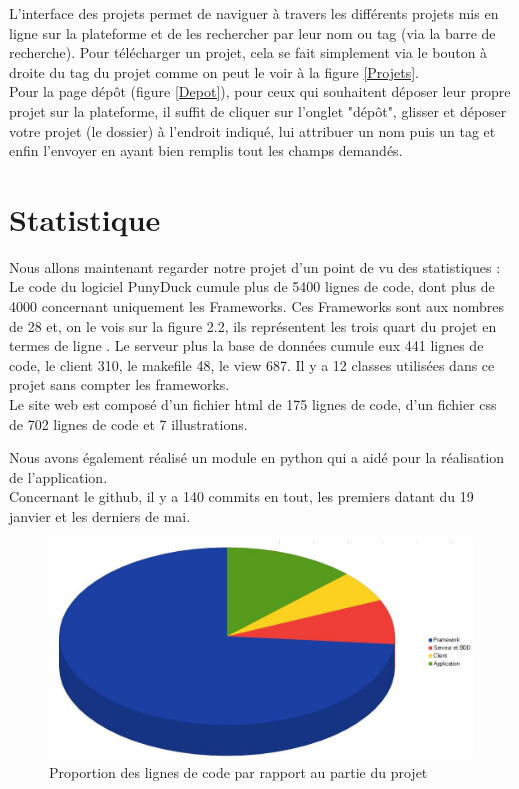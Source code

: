 \documentclass{report}
\begin{document}
L'interface des projets permet de naviguer à travers les différents projets mis en ligne sur la plateforme et de les rechercher par leur nom ou tag (via la barre de recherche). Pour télécharger un projet, cela se fait simplement via le bouton à droite du tag du projet comme on peut le voir à la figure \ref{Projets}.\\
Pour la page dépôt (figure \ref{Depot}), pour ceux qui souhaitent déposer leur propre projet sur la plateforme, il suffit de cliquer sur l'onglet "dépôt", glisser et déposer votre projet (le dossier) à l'endroit indiqué, lui attribuer un nom puis un tag et enfin l'envoyer en ayant bien remplis tout les champs demandés.
\\

\newpage
\section{Statistique} %
Nous allons maintenant regarder notre projet d’un point de vu des statistiques :\\
Le code du logiciel PunyDuck cumule plus de 5400 lignes de code, dont plus de 4000 concernant uniquement les Frameworks. Ces Frameworks sont aux nombres de 28 et, on le vois sur la figure 2.2, ils représentent les trois quart du projet en termes de ligne . Le serveur plus la base de données cumule eux 441 lignes de code, le client 310, le makefile 48, le view 687. Il y a 12 classes utilisées dans ce projet sans compter les frameworks.\\
Le site web est composé d’un fichier html de 175 lignes de code, d’un fichier css de 702 lignes de code et 7 illustrations.

Nous avons également réalisé un module en python qui a aidé pour la réalisation de l'application.\\
Concernant le github, il y a 140 commits en tout, les premiers datant du 19 janvier et les derniers de mai.
\begin{figure}[h]
    \centering
    \includegraphics[scale=0.6]{camenbertstatPNDK.JPG}
    \caption{Proportion des lignes de code par rapport au partie du projet}
    \label{fig:my_label}
\end{figure}
\end{document}
